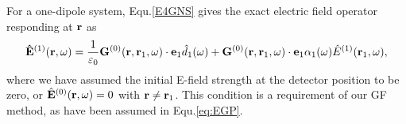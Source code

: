 For a one-dipole system, Equ.\eqref{E4GNS} gives the exact electric field operator responding at $\mathbf{r}$ as
\begin{equation}
\mathbf{\hat{E}}^{(1)}(\mathbf{r},\omega)=\frac{1}{\varepsilon_0}\mathbf{G}^{(0)}(\mathbf{r},\mathbf{r}_1,\omega)\cdot
{\bf
e}_1\hat{d}_1(\omega)+\mathbf{G}^{(0)}(\mathbf{r},\mathbf{r}_1,\omega)\cdot
{\bf e}_1 \alpha_1(\omega) \hat{E}^{(1)} (\mathbf{r}_1,\omega),
\end{equation}
where we have assumed the initial E-field strength at the detector position to be zero, or $\E0=0$ with ${\bf r}\neq {\bf r}_1$. This condition is a requirement of our GF method, as have been assumed in Equ.\eqref{eq:EGP}.

